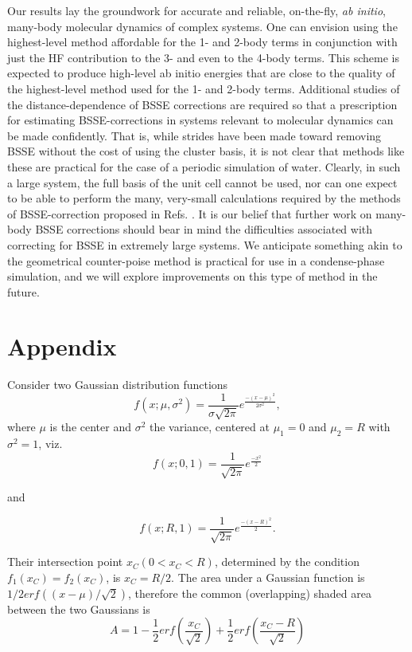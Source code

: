 \documentclass[11pt, proquest]{uwthesis}[2020/02/24]
\begin{document}
\par Our results lay the groundwork for accurate and reliable, on-the-fly, \textit{ab initio}, many-body molecular dynamics of complex systems. One can envision using the highest-level method affordable for the 1- and 2-body terms in conjunction with just the HF contribution to the 3- and even to the 4-body terms. This scheme is expected to produce high-level ab initio energies that are close to the quality of the highest-level method used for the 1- and 2-body terms. Additional studies of the distance-dependence of BSSE corrections are required so that a prescription for estimating BSSE-corrections in systems relevant to molecular dynamics can be made confidently. That is, while strides have been made toward removing BSSE without the cost of using the cluster basis,\autocite{richard_understanding_2018,ouyang_many-body_2015,mayer_many-body_2017} it is not clear that methods like these are practical for the case of a periodic simulation of water. Clearly, in such a large system, the full basis of the unit cell cannot be used, nor can one expect to be able to perform the many, very-small calculations required by the methods of BSSE-correction proposed in Refs. \cite{richard_understanding_2018,ouyang_many-body_2015,mayer_many-body_2017}. It is our belief that further work on many-body BSSE corrections should bear in mind the difficulties associated with correcting for BSSE in extremely large systems. We anticipate something akin to the geometrical counter-poise method\autocite{kruse_geometrical_2012} is practical for use in a condense-phase simulation, and we will explore improvements on this type of method in the future.

\section{Appendix}

Consider two Gaussian distribution functions 
$$f(x;\mu, \sigma^2)=\frac{1}{\sigma\sqrt{2\pi}}e^{\frac{-(x-\mu)^2}{2\sigma^2}},$$
where $\mu$ is the center and $\sigma^2$ the variance, centered at $\mu_1=0$ and $\mu_2=R$ with $\sigma^2=1$, viz.
$$
f(x;0, 1)=\frac{1}{\sqrt{2\pi}}e^{\frac{-x^2}{2}}
$$

and

$$
f(x;R, 1)=\frac{1}{\sqrt{2\pi}}e^{\frac{-(x-R)^2}{2}}.
$$

Their intersection point $x_C(0<x_C<R)$, determined by the condition $f_1(x_C)=f_2(x_C)$, is $x_C=R/2$. The area under a Gaussian function is $1/2erf((x-\mu)/\sqrt{2})$, therefore the common (overlapping) shaded area  between the two Gaussians is
$$
A=1-\frac{1}{2}erf\left(\frac{x_C}{\sqrt{2}}\right)+\frac{1}{2}erf\left(\frac{x_C-R}{\sqrt{2}}\right)
$$
\end{document}
